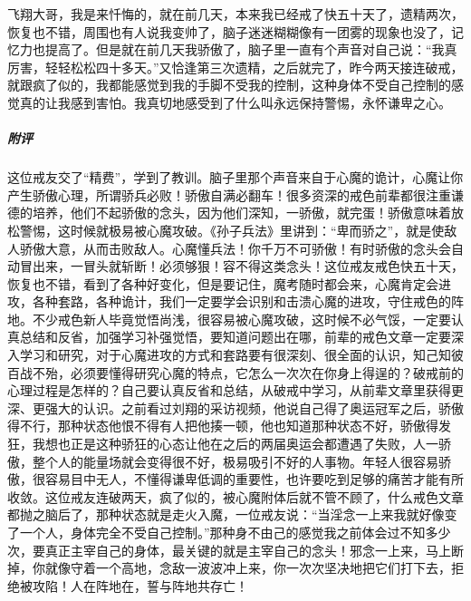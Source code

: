 \begin{case}
    飞翔大哥，我是来忏悔的，就在前几天，本来我已经戒了快五十天了，遗精两次，恢复也不错，周围也有人说我变帅了，脑子迷迷糊糊像有一团雾的现象也没了，记忆力也提高了。但是就在前几天我骄傲了，脑子里一直有个声音对自己说：“我真厉害，轻轻松松四十多天。”又恰逢第三次遗精，之后就完了，昨今两天接连破戒，就跟疯了似的，我都能感觉到我的手脚不受我的控制，这种身体不受自己控制的感觉真的让我感到害怕。我真切地感受到了什么叫永远保持警惕，永怀谦卑之心。
    \subparagraph{附评} 这位戒友交了“精费”，学到了教训。脑子里那个声音来自于心魔的诡计，心魔让你产生骄傲心理，所谓骄兵必败！骄傲自满必翻车！很多资深的戒色前辈都很注重谦德的培养，他们不起骄傲的念头，因为他们深知，一骄傲，就完蛋！骄傲意味着放松警惕，这时候就极易被心魔攻破。《孙子兵法》里讲到：“卑而骄之”，就是使敌人骄傲大意，从而击败敌人。心魔懂兵法！你千万不可骄傲！有时骄傲的念头会自动冒出来，一冒头就斩断！必须够狠！容不得这类念头！这位戒友戒色快五十天，恢复也不错，看到了各种好变化，但是要记住，魔考随时都会来，心魔肯定会进攻，各种套路，各种诡计，我们一定要学会识别和击溃心魔的进攻，守住戒色的阵地。不少戒色新人毕竟觉悟尚浅，很容易被心魔攻破，这时候不必气馁，一定要认真总结和反省，加强学习补强觉悟，要知道问题出在哪，前辈的戒色文章一定要深入学习和研究，对于心魔进攻的方式和套路要有很深刻、很全面的认识，知己知彼百战不殆，必须要懂得研究心魔的特点，它怎么一次次在你身上得逞的？破戒前的心理过程是怎样的？自己要认真反省和总结，从破戒中学习，从前辈文章里获得更深、更强大的认识。之前看过刘翔的采访视频，他说自己得了奥运冠军之后，骄傲得不行，那种状态他恨不得有人把他揍一顿，他也知道那种状态不好，骄傲得发狂，我想也正是这种骄狂的心态让他在之后的两届奥运会都遭遇了失败，人一骄傲，整个人的能量场就会变得很不好，极易吸引不好的人事物。年轻人很容易骄傲，很容易目中无人，不懂得谦卑低调的重要性，也许要吃到足够的痛苦才能有所收敛。这位戒友连破两天，疯了似的，被心魔附体后就不管不顾了，什么戒色文章都抛之脑后了，那种状态就是走火入魔，一位戒友说：“当淫念一上来我就好像变了一个人，身体完全不受自己控制。”那种身不由己的感觉我之前体会过不知多少次，要真正主宰自己的身体，最关键的就是主宰自己的念头！邪念一上来，马上断掉，你就像守着一个高地，念敌一波波冲上来，你一次次坚决地把它们打下去，拒绝被攻陷！人在阵地在，誓与阵地共存亡！
\end{case}

